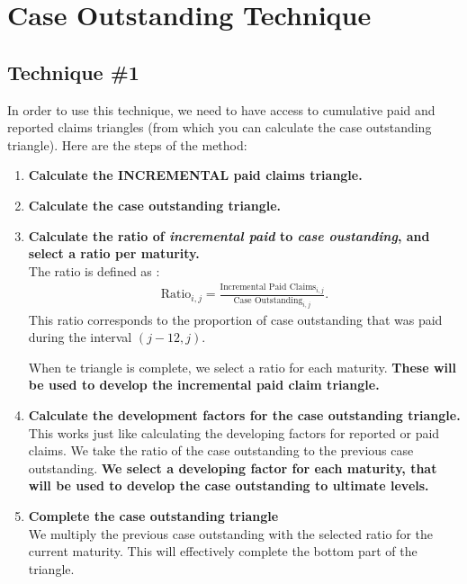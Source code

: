 \documentclass[11pt, english]{memoir}
\numberwithin{definition}{section}
\begin{document}
\chapter{Case Outstanding Technique}

\section{Technique \#1}
	In order to use this technique, we need to have access to cumulative paid and reported claims triangles (from which you can calculate the case outstanding triangle). Here are the steps of the method: 
	\begin{enumerate}
		\item \textbf{Calculate the INCREMENTAL paid claims triangle.}\\
		
		\item \textbf{Calculate the case outstanding triangle.}\\
		
		\item \textbf{Calculate the ratio of \emph{incremental paid} to \emph{case oustanding}, and select a ratio per maturity.}\\
		The ratio is defined as :
		\begin{align*}
		\text{Ratio}_{i,j} = \frac{\text{Incremental Paid Claims}_{i,j}}{\text{Case Outstanding}_{i,j}}.
		\end{align*}
		This ratio corresponds to the proportion of case outstanding that was paid during the interval $ (j-12, j) $.
		
		When te triangle is complete, we select a ratio for each maturity. \textbf{These will be used to develop the incremental paid claim triangle. }\\
		
		
		\item \textbf{Calculate the development factors for the case outstanding triangle.}\\
		This works just like calculating the developing factors for reported or paid claims. We take the ratio of the case outstanding to the previous case outstanding. \textbf{We select a developing factor for each maturity, that will be used to develop the case outstanding to ultimate levels.} \\
		
		
		
		\item \textbf{Complete the case outstanding triangle}\\
		We multiply the previous case outstanding with the selected ratio for the current maturity. This will effectively complete the bottom part of the triangle. \\
		

\end{enumerate}
\end{document}
